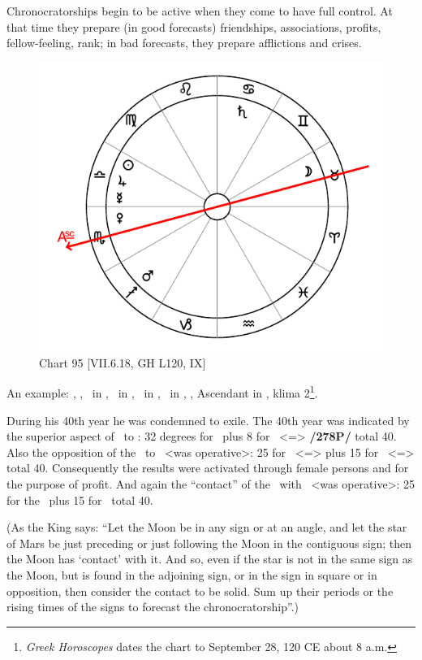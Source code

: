 Chronocratorships begin to be active when they come to have full
control. At that time they prepare (in good forecasts) friendships, associations, profits, fellow-feeling, rank; in bad forecasts, they prepare afflictions and crises.

\newpage
\begin{figure}
\centering
\vspace{0pt}
\includegraphics[width=.68\textwidth]{charts/7_6_18}
\caption{Chart 95 [VII.6.18, GH L120, IX] }
\label{fig:chart95}
\end{figure} 

An example: \Sun, \Jupiter, \Mercury\, in \Libra, \Moon\, in \Taurus, \Saturn\, in \Cancer, \Mars\, in \Sagittarius,
\Venus, Ascendant in \Scorpio, klima 2\footnote{\textit{Greek Horoscopes} dates the chart to September 28, 120 CE about 8 a.m.}.

During his 40th year he was condemned to exile. The 40th year
was indicated by the superior aspect of \Saturn\, to \Libra: 32 degrees for \Cancer\, plus 8 for \Libra\, <=\Venus>
\textbf{/278P/} total 40. Also the opposition of the \Moon\, to \Venus\, <was operative>: 25 for \Taurus\, <=\Moon> plus 15 for \Scorpio\, <=\Mars> total 40. Consequently the results were activated through female persons and
for the purpose of profit. And again the “contact” of the \Moon\, with \Mars\, <was operative>: 25 for the \Moon\, plus 15 for \Mars\, total 40.

(As the King says: “Let the Moon be in any sign or at an angle, and let the star of Mars be just preceding or just following the Moon in the contiguous sign; then the Moon has ‘contact’ with it. And so, even if the star is not in the same sign as the Moon, but is found in the adjoining sign, or in the sign in square or in opposition, then consider the contact to be solid. Sum up their periods or the rising times of
the signs to forecast the chronocratorship”.)

